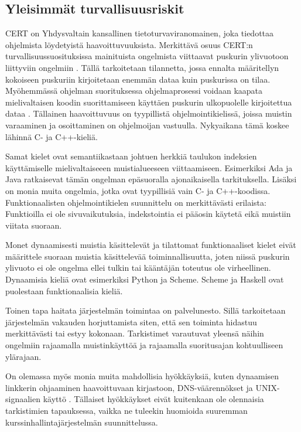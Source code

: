 \subsection{Yleisimmät turvallisuusriskit}

CERT on Yhdysvaltain kansallinen tietoturvaviranomainen, joka tiedottaa
ohjelmista löydetyistä haavoittuvuuksista.
Merkittävä osuus CERT:n turvallisuussuosituksissa mainituista ongelmista
viittaavat puskurin ylivuotoon liittyviin ongelmiin \citep{cert}. Tällä
tarkoitetaan tilannetta, jossa ennalta määritellyn
kokoiseen puskuriin kirjoitetaan enemmän dataa kuin puskurissa on tilaa.
Myöhemmässä ohjelman suorituksessa ohjelmaprosessi voidaan kaapata
mielivaltaisen koodin suorittamiseen käyttäen puskurin ulkopuolelle kirjoitettua
dataa \citep{tevis2004methods}. Tällainen haavoittuvuus on tyypillistä
ohjelmointikielissä, joissa muistin varaaminen ja osoittaminen on ohjelmoijan
vastuulla. Nykyaikana tämä koskee lähinnä C- ja C++-kieliä.

Samat kielet ovat semantiikastaan johtuen herkkiä taulukon indeksien
käyttämiselle mielivaltaiseeen muistialueeseen viittaamiseen. Esimerkiksi
Ada ja Java ratkaisevat tämän ongelman epäsuoralla ajonaikaisella
tarkituksella. Lisäksi on monia muita ongelmia, jotka ovat tyypillisiä vain
C- ja C++-koodissa. Funktionaalisten ohjelmointikielen suunnittelu on
merkittävästi erilaista: Funktioilla ei ole sivuvaikutuksia, indekstointia
ei pääosin käytetä eikä muistiin viitata suoraan. \citet{tevis2004methods}

Monet dynaamisesti muistia käsittelevät ja tilattomat funktionaaliset kielet
eivät määrittele suoraan muistia käsittelevää toiminnallisuutta, joten niissä
puskurin ylivuoto ei ole ongelma ellei tulkin tai kääntäjän toteutus
ole virheellinen. Dynaamisia kieliä ovat esimerkiksi Python ja Scheme. Scheme
ja Haskell ovat puolestaan funktionaalisia kieliä.

Toinen tapa haitata järjestelmän toimintaa on palvelunesto. Sillä tarkoitetaan
järjestelmän vakauden horjuttamista siten, että sen toiminta hidastuu
merkittävästi tai estyy kokonaan. Tarkistimet varautuvat yleensä näihin
ongelmiin rajaamalla muistinkäyttöä ja rajaamalla suoritusajan kohtuulliseen
ylärajaan.

On olemassa myös monia muita mahdollisia hyökkäyksiä, kuten dynaamisen linkkerin
ohjaaminen haavoittuvaan kirjastoon, DNS-väärennökset ja UNIX-signaalien käyttö
\citep{tevis2004methods}. Tällaiset hyökkäykset eivät kuitenkaan ole olennaisia
tarkistimien tapauksessa, vaikka ne tuleekin huomioida suuremman
kurssinhallintajärjestelmän suunnittelussa.

